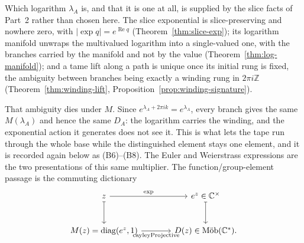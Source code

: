 \documentclass[11pt]{article}
\newcommand{\CC}{\mathbb{C}}
\newcommand{\ZZ}{\mathbb{Z}}
\theoremstyle{plain}
\theoremstyle{definition}
\theoremstyle{remark}
\begin{document}
\begin{tcolorbox}
Which logarithm $\lambda_A$ is, and that it is one at all, is supplied by the
slice facts of Part~2 rather than chosen here. The slice exponential is
slice-preserving and nowhere zero, with $\lvert\exp q\rvert=e^{\operatorname{Re}q}$
\textup{(}Theorem~\ref{thm:slice-exp}\textup{)}; its logarithm manifold
unwraps the multivalued logarithm into a single-valued one, with the branches
carried by the manifold and not by the value
\textup{(}Theorem~\ref{thm:log-manifold}\textup{)}; and a tame lift along a path
is unique once its initial rung is fixed, the ambiguity between branches being
exactly a winding rung in $2\pi i\ZZ$
\textup{(}Theorem~\ref{thm:winding-lift},
Proposition~\ref{prop:winding-signature}\textup{)}.

That ambiguity dies under $M$. Since $e^{\lambda_A+2\pi ik}=e^{\lambda_A}$,
every branch gives the same $M(\lambda_A)$ and hence the same $D_A$: the
logarithm carries the winding, and the exponential action it generates does not
see it. This is what lets the tape run through the whole base while the
distinguished element stays one element, and it is recorded again below as
\textup{(B6)--(B8)}.
The Euler and Weierstrass expressions are the two presentations of this same multiplier. The
function/group-element passage is the commuting dictionary
\[
\begin{tikzcd}[column sep=large,row sep=large]
z \arrow[r,"\exp"] \arrow[d,mapsto] & e^z\in\CC^\times \arrow[d,mapsto]\\
M(z)=\operatorname{diag}(e^z,1)
  \arrow[r,"\operatorname{cayleyProjective}"'] &
D(z)\in\operatorname{M\ddot ob}(\CC^*).
\end{tikzcd}
\]


\end{tcolorbox}
\end{document}
